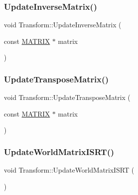 \mbox{\label{class_transform_a3d2e5da24fb1c8015f5bb9a6c0a7a7de}} 
\subsubsection{\texorpdfstring{Update\+Inverse\+Matrix()}{UpdateInverseMatrix()}}
{\footnotesize\ttfamily void Transform\+::\+Update\+Inverse\+Matrix (\begin{DoxyParamCaption}\item[{const \mbox{\hyperlink{_vector3_d_8h_a032295cd9fb1b711757c90667278e744}{M\+A\+T\+R\+IX}} $\ast$}]{matrix }\end{DoxyParamCaption})\hspace{0.3cm}{\ttfamily [inline]}}

\mbox{\label{class_transform_a486ae5501b5081b22ee053f787e0e4a2}} 
\subsubsection{\texorpdfstring{Update\+Transpose\+Matrix()}{UpdateTransposeMatrix()}}
{\footnotesize\ttfamily void Transform\+::\+Update\+Transpose\+Matrix (\begin{DoxyParamCaption}\item[{const \mbox{\hyperlink{_vector3_d_8h_a032295cd9fb1b711757c90667278e744}{M\+A\+T\+R\+IX}} $\ast$}]{matrix }\end{DoxyParamCaption})\hspace{0.3cm}{\ttfamily [inline]}}

\mbox{\label{class_transform_a3d56e19fba7f44d5f938d62481846fbc}} 
\subsubsection{\texorpdfstring{Update\+World\+Matrix\+I\+S\+R\+T()}{UpdateWorldMatrixISRT()}}
{\footnotesize\ttfamily void Transform\+::\+Update\+World\+Matrix\+I\+S\+RT (\begin{DoxyParamCaption}{ }\end{DoxyParamCaption})}

